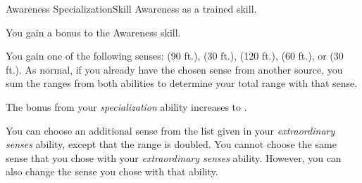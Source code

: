     \begin{feat}{Awareness Specialization}{Skill}
        \featpre Awareness as a trained skill.

         You gain a  bonus to the Awareness skill.

         You gain one of the following senses:  (90 ft.),  (30 ft.),  (120 ft.),  (60 ft.), or  (30 ft.).
        As normal, if you already have the chosen sense from another source, you sum the ranges from both abilities to determine your total range with that sense.

         The bonus from your \textit{specialization} ability increases to .

         You can choose an additional sense from the list given in your \textit{extraordinary senses} ability, except that the range is doubled.
        You cannot choose the same sense that you chose with your \textit{extraordinary senses} ability.
        However, you can also change the sense you chose with that ability.
    \end{feat}

